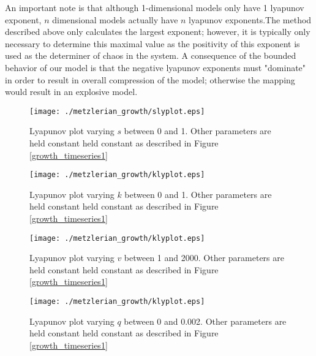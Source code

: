 An important note is that although 1-dimensional models only have 1 lyapunov exponent, $n$ dimensional models actually have $n$ lyapunov exponents.The method described above only calculates the largest exponent; however, it is typically only necessary to determine this maximal value as the positivity of this exponent is used as the determiner of chaos in the system. A consequence of the bounded behavior of our model is that the negative lyapunov exponents must "dominate" in order to result in overall compression of the model; otherwise the mapping would result in an explosive model. 

\begin{figure}
    \centering
    \texttt{[image: ./metzlerian\_growth/slyplot.eps]}
    \caption{Lyapunov plot varying $s$ between 0 and 1. Other parameters are held constant held constant as described in Figure \ref{growth_timeseries1}}
    \label{slyapunov}
\end{figure}
\begin{figure}
    \centering
    \texttt{[image: ./metzlerian\_growth/klyplot.eps]}
    \caption{Lyapunov plot varying $k$ between 0 and 1. Other parameters are held constant held constant as described in Figure \ref{growth_timeseries1}}
    \label{klyapunov}
\end{figure}
\begin{figure}
    \centering
    \texttt{[image: ./metzlerian\_growth/klyplot.eps]}
    \caption{Lyapunov plot varying $v$ between 1 and 2000. Other parameters are held constant held constant as described in Figure \ref{growth_timeseries1}}
    \label{klyapunov}
\end{figure}
\begin{figure}
    \centering
    \texttt{[image: ./metzlerian\_growth/klyplot.eps]}
    \caption{Lyapunov plot varying $q$ between 0 and 0.002. Other parameters are held constant held constant as described in Figure \ref{growth_timeseries1}}
    \label{klyapunov}
\end{figure}











